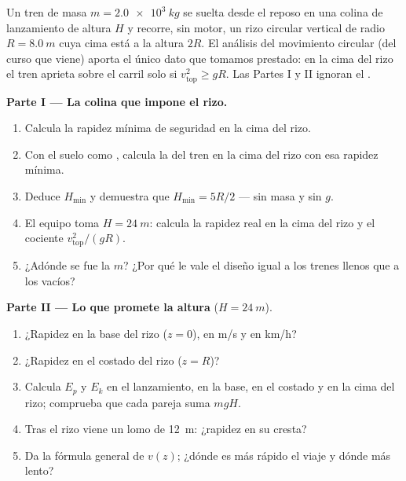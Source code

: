 \begin{problem}
\label{pb:g11:mechanical-energy:1}
Un tren de masa $m = \qty{2.0e3}{kg}$ se suelta desde el reposo en una
colina de lanzamiento de altura $H$ y recorre, sin motor, un rizo
circular vertical de radio $R = \qty{8.0}{m}$ cuya cima está a la altura
$2R$. El análisis del movimiento circular (del curso que viene) aporta
el único dato que tomamos prestado: en la cima del rizo el tren aprieta
sobre el carril solo si $v_{\text{top}}^2 \geq gR$. Las Partes I y II
ignoran el .

\medskip
\noindent\textbf{Parte I --- La colina que impone el rizo.}
\begin{enumerate}
  \item Calcula la rapidez mínima de seguridad en la cima del rizo.
  \item Con el suelo como , calcula la  del tren en la cima del rizo con esa rapidez mínima.
  \item Deduce $H_{\min}$ y demuestra que $H_{\min} = 5R/2$ --- sin masa
        y sin $g$.
  \item El equipo toma $H = \qty{24}{m}$: calcula la rapidez real en la
        cima del rizo y el cociente $v_{\text{top}}^2/(gR)$.
  \item ¿Adónde se fue la $m$? ¿Por qué le vale el diseño igual a los
        trenes llenos que a los vacíos?
\end{enumerate}

\medskip
\noindent\textbf{Parte II --- Lo que promete la altura}
($H = \qty{24}{m}$).
\begin{enumerate}[resume]
  \item ¿Rapidez en la base del rizo ($z = 0$), en \unit{m/s} y en
        \unit{km/h}?
  \item ¿Rapidez en el costado del rizo ($z = R$)?
  \item Calcula $E_p$ y $E_k$ en el lanzamiento, en la base, en el
        costado y en la cima del rizo; comprueba que cada pareja suma
        $mgH$.
  \item Tras el rizo viene un lomo de \qty{12}{m}: ¿rapidez en su
        cresta?
  \item Da la fórmula general de $v(z)$; ¿dónde es más rápido el viaje y
        dónde más lento?
\end{enumerate}


\end{problem}
